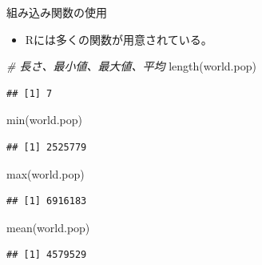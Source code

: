\documentclass[
  ignorenonframetext,
]{beamer}
\newenvironment{Shaded}{\begin{snugshade}}{\end{snugshade}}
\newcommand{\CommentTok}[1]{\textcolor[rgb]{0.56,0.35,0.01}{\textit{#1}}}
\newcommand{\FunctionTok}[1]{\textcolor[rgb]{0.00,0.00,0.00}{#1}}
\newcommand{\NormalTok}[1]{#1}
\providecommand{\tightlist}{%
  \setlength{\itemsep}{0pt}\setlength{\parskip}{0pt}}
\begin{document}
\begin{frame}[fragile]{組み込み関数の使用}
\protect\hypertarget{ux7d44ux307fux8fbcux307fux95a2ux6570ux306eux4f7fux7528}{}
\begin{itemize}
\tightlist
\item
  Rには多くの関数が用意されている。
\end{itemize}

\begin{Shaded}
\begin{Highlighting}[]
\CommentTok{\# 長さ、最小値、最大値、平均}
\FunctionTok{length}\NormalTok{(world.pop)  }
\end{Highlighting}
\end{Shaded}

\begin{verbatim}
## [1] 7
\end{verbatim}

\begin{Shaded}
\begin{Highlighting}[]
\FunctionTok{min}\NormalTok{(world.pop)     }
\end{Highlighting}
\end{Shaded}

\begin{verbatim}
## [1] 2525779
\end{verbatim}

\begin{Shaded}
\begin{Highlighting}[]
\FunctionTok{max}\NormalTok{(world.pop)     }
\end{Highlighting}
\end{Shaded}

\begin{verbatim}
## [1] 6916183
\end{verbatim}

\begin{Shaded}
\begin{Highlighting}[]
\FunctionTok{mean}\NormalTok{(world.pop)    }
\end{Highlighting}
\end{Shaded}

\begin{verbatim}
## [1] 4579529
\end{verbatim}
\end{frame}
\end{document}
